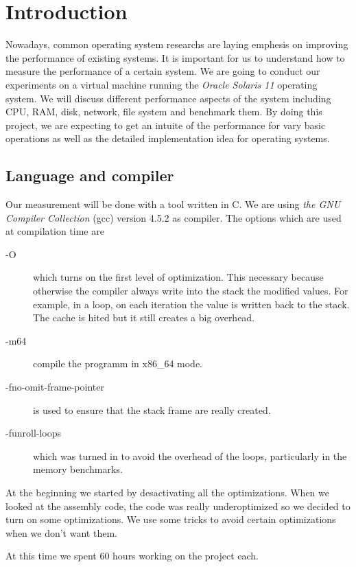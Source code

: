 \section{Introduction}

Nowadays, common operating system researchs are laying emphesis on improving the performance of existing systems.
It is important for us to understand how to measure the performance of a certain system.
We are going to conduct our experiments on a virtual machine running the \emph{Oracle Solaris
11} operating system.
We will discuss different performance aspects of the system including CPU, RAM, disk,
network, file system and benchmark them.
By doing this project, we are expecting to get an intuite of the performance for
vary basic operations as well as the detailed implementation idea for operating systems.

\subsection{Language and compiler}
Our measurement will be done with a tool written in C.
We are using \emph{the GNU Compiler Collection} (gcc) version 4.5.2 as
compiler.
The options which are used at compilation time are 
\begin{description}
\item[-O] which turns on the first level of optimization.
This necessary because otherwise the compiler always write into the stack the modified values.
For example, in a loop, on each iteration the value is written back to the stack.
The cache is hited but it still creates a big overhead.
\item[-m64] compile the programm in x86\_64 mode.
\item[-fno-omit-frame-pointer] is used to ensure that the stack frame are really created.
\item[-funroll-loops] which was turned in to avoid the overhead of the loops, particularly in the memory benchmarks.
\end{description}

At the beginning we started by desactivating all the optimizations.
When we looked at the assembly code, the code was really underoptimized so we decided to turn on some optimizations.
We use some tricks to avoid certain optimizations when we don't want them.

At this time we spent 60 hours working on the project each.
